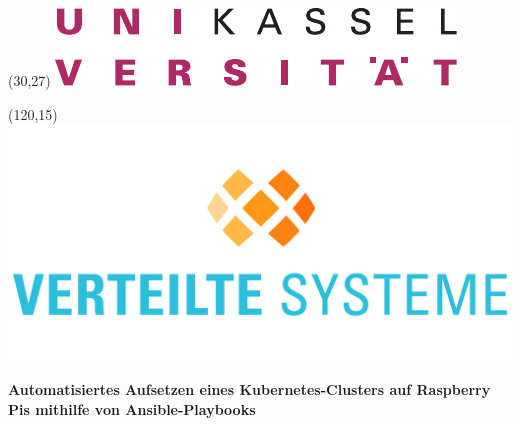 \begin{titlepage}
\newcommand{\Titel}[2][\textwidth]{\renewcommand{\baselinestretch}{1.0}\hfil
            \parbox{#1}{\huge\bfseries\centering #2}\hfil\par}
\renewcommand{\subtitle}[2][\textwidth]{\renewcommand{\baselinestretch}{1.0}\hfil
            \parbox{#1}{\LARGE\centering\mbox{}\llap{--~}#2\rlap{~--}}\hfil\par}
\newcommand{\addLine}[2][\textwidth]{\renewcommand{\baselinestretch}{1.0}\hfil
            \parbox{#1}{\large\centering #2}\hfil\par}


\begin{textblock}{40}(30,27)
 \includegraphics[scale=0.7]{img/unilogo.pdf}
\end{textblock}

\begin{textblock}{40}(120,15)
 \includegraphics[scale=0.07]{img/vs-color.pdf}
\end{textblock}

\addLine{}
\vspace{0.2\textheight}

\Titel{Automatisiertes Aufsetzen eines Kubernetes-Clusters auf Raspberry Pis mithilfe von Ansible-Playbooks}

\newcommand*{\student}{KL}
\newcommand*{\matrikelnummer}{-}
\newcommand*{\betreuerA}{RH}
\newcommand*{\betreuerB}{HB}


\end{titlepage}
